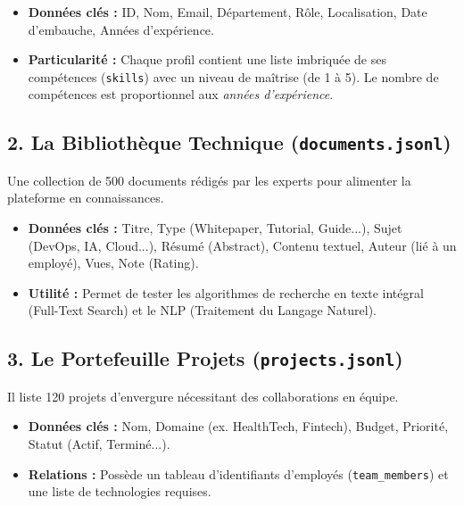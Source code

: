 \documentclass[12pt,a4paper]{article}
\begin{document}
\begin{itemize}[label=\textcolor{primary}{\textbullet}]
    \item \textbf{Données clés :} ID, Nom, Email, Département, Rôle, Localisation, Date d'embauche, Années d'expérience.
    \item \textbf{Particularité :} Chaque profil contient une liste imbriquée de ses compétences (\texttt{skills}) avec un niveau de maîtrise (de 1 à 5). Le nombre de compétences est proportionnel aux \textit{années d'expérience}.
\end{itemize}

\subsection{2. La Bibliothèque Technique (\texttt{documents.jsonl})}
Une collection de 500 documents rédigés par les experts pour alimenter la plateforme en connaissances.

\begin{itemize}[label=\textcolor{primary}{\textbullet}]
    \item \textbf{Données clés :} Titre, Type (Whitepaper, Tutorial, Guide...), Sujet (DevOps, IA, Cloud...), Résumé (Abstract), Contenu textuel, Auteur (lié à un employé), Vues, Note (Rating).
    \item \textbf{Utilité :} Permet de tester les algorithmes de recherche en texte intégral (Full-Text Search) et le NLP (Traitement du Langage Naturel).
\end{itemize}

\subsection{3. Le Portefeuille Projets (\texttt{projects.jsonl})}
Il liste 120 projets d'envergure nécessitant des collaborations en équipe.

\begin{itemize}[label=\textcolor{primary}{\textbullet}]
    \item \textbf{Données clés :} Nom, Domaine (ex. HealthTech, Fintech), Budget, Priorité, Statut (Actif, Terminé...).
    \item \textbf{Relations :} Possède un tableau d'identifiants d'employés (\texttt{team\_members}) et une liste de technologies requises.
\end{itemize}

\begin{center}
\end{center}
\end{document}
